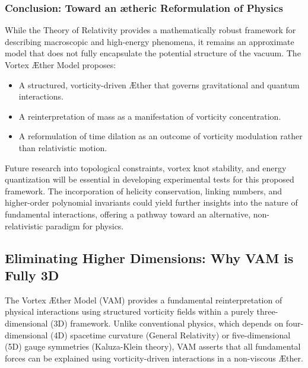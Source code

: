\documentclass[a4paper,10pt]{article}
\begin{document}
\subsubsection*{Conclusion: Toward an ætheric Reformulation of Physics}
While the Theory of Relativity provides a mathematically robust framework for describing macroscopic and high-energy phenomena, it remains an approximate model that does not fully encapsulate the potential structure of the vacuum.
The Vortex Æther Model proposes:

\begin{itemize}
    \item A structured, vorticity-driven Æther that governs gravitational and quantum interactions.
    \item A reinterpretation of mass as a manifestation of vorticity concentration.
    \item A reformulation of time dilation as an outcome of vorticity modulation rather than relativistic motion.
\end{itemize}
Future research into topological constraints, vortex knot stability, and energy quantization will be essential in developing experimental tests for this proposed framework.
The incorporation of helicity conservation, linking numbers, and higher-order polynomial invariants could yield further insights into the nature of fundamental interactions, offering a pathway toward an alternative, non-relativistic paradigm for physics.

    \subsection{Eliminating Higher Dimensions: Why VAM is Fully 3D}\label{subsec:eliminating-higher-dimensions}

The Vortex Æther Model (VAM) provides a fundamental reinterpretation of physical interactions using structured vorticity fields within a purely three-dimensional (3D) framework. Unlike conventional physics, which depends on four-dimensional (4D) spacetime curvature (General Relativity) or five-dimensional (5D) gauge symmetries (Kaluza-Klein theory), VAM asserts that all fundamental forces can be explained using vorticity-driven interactions in a non-viscous Æther.
\end{document}
